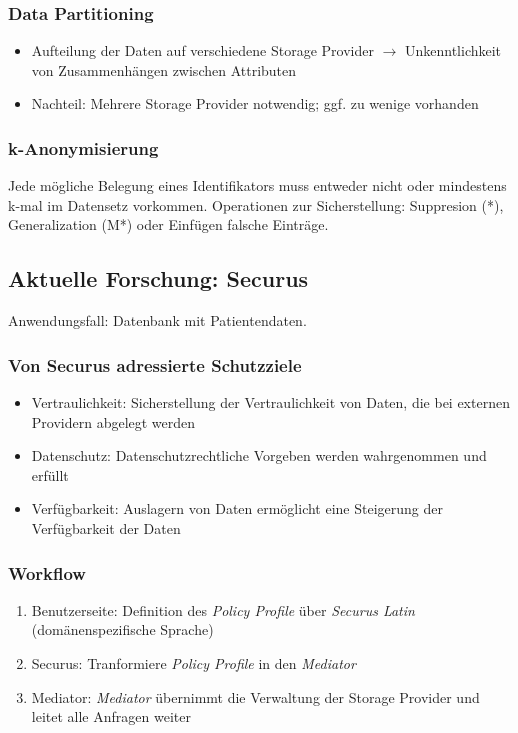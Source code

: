 \subsubsection{Data Partitioning}
\begin{itemize}
	\item Aufteilung der Daten auf verschiedene Storage Provider $\rightarrow$ Unkenntlichkeit von Zusammenhängen zwischen Attributen
	\item Nachteil: Mehrere Storage Provider notwendig; ggf. zu wenige vorhanden
\end{itemize}

\subsubsection{k-Anonymisierung}
Jede mögliche Belegung eines Identifikators muss entweder nicht oder mindestens k-mal im Datensetz vorkommen. Operationen zur Sicherstellung: Suppresion (*), Generalization (M*) oder Einfügen falsche Einträge.


\subsection{Aktuelle Forschung: Securus}
Anwendungsfall: Datenbank mit Patientendaten.

\subsubsection{Von Securus adressierte Schutzziele}
\begin{itemize}
	\item Vertraulichkeit: Sicherstellung der Vertraulichkeit von Daten, die bei externen Providern abgelegt werden
	\item Datenschutz: Datenschutzrechtliche Vorgeben werden wahrgenommen und erfüllt
	\item Verfügbarkeit: Auslagern von Daten ermöglicht eine Steigerung der Verfügbarkeit der Daten
\end{itemize}

\subsubsection{Workflow}
\begin{enumerate}
	\item Benutzerseite: Definition des \textit{Policy Profile} über \textit{Securus Latin} (domänenspezifische Sprache)
	\item Securus: Tranformiere \textit{Policy Profile} in den \textit{Mediator}
	\item Mediator: \textit{Mediator} übernimmt die Verwaltung der Storage Provider und leitet alle Anfragen weiter
\end{enumerate}

